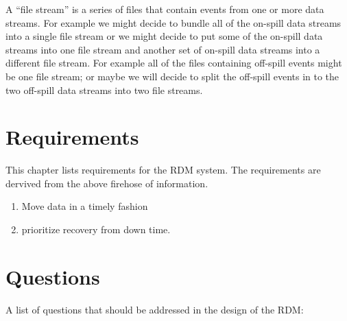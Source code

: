 A ``file stream'' is a series of files that contain events from one or more data streams.
For example we might decide to bundle all of the on-spill data streams into a single
file stream or we might decide to put some of the on-spill data streams into one file
stream and another set of on-spill data streams into a different file stream.
For example all of the files containing off-spill events might be one file stream;
or maybe we will decide to split the off-spill events in to
the two off-spill data streams into two file streams.



\chapter{Requirements}

This chapter lists requirements for the RDM system.
The requirements are dervived from the above firehose of information.

\begin{enumerate}
  \item Move data in a timely fashion
  \item prioritize recovery from down time.
\end{enumerate}

\chapter{Questions}

A list of questions that should be addressed in the design of the RDM:

